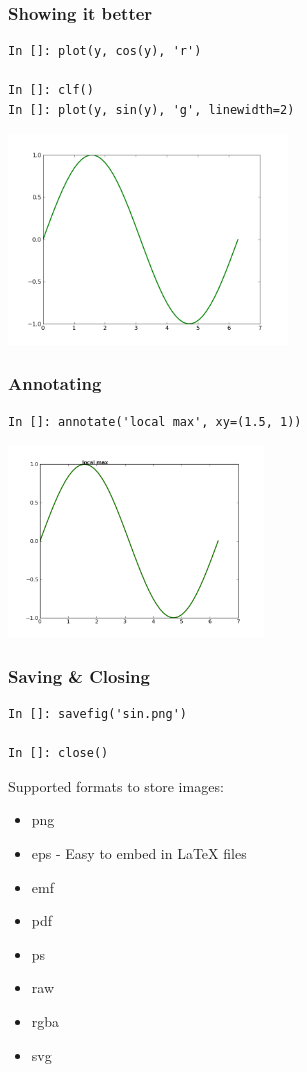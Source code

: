 \documentclass[14pt,compress]{beamer}
\newcounter{time}
\newcommand{\inctime}[1]{\addtocounter{time}{#1}{\tiny \thetime\ m}}
\begin{document}
\begin{frame}[fragile]
\frametitle{Showing it better}
\vspace{-0.15in}
\begin{lstlisting}
In []: plot(y, cos(y), 'r')

In []: clf()
In []: plot(y, sin(y), 'g', linewidth=2)
\end{lstlisting}
\vspace*{-0.2in}
\begin{center}
  \includegraphics[height=2.2in, interpolate=true]{data/green}  
\end{center}
\end{frame}

\begin{frame}[fragile]
\frametitle{Annotating}
\vspace*{-0.15in}
\begin{lstlisting}
In []: annotate('local max', xy=(1.5, 1))
\end{lstlisting}
\vspace*{-0.2in}
\begin{center}
  \includegraphics[height=2in, interpolate=true]{data/annotate}  
\end{center}
\end{frame}

\begin{frame}[fragile]
\frametitle{Saving \& Closing}
\begin{lstlisting}
In []: savefig('sin.png')

In []: close()
\end{lstlisting}
Supported formats to store images:
\begin{itemize}
\item png
\item eps - Easy to embed in LaTeX files
\item emf
\item pdf
\item ps
\item raw
\item rgba
\item svg
\end{itemize}
\end{frame}
\end{document}
